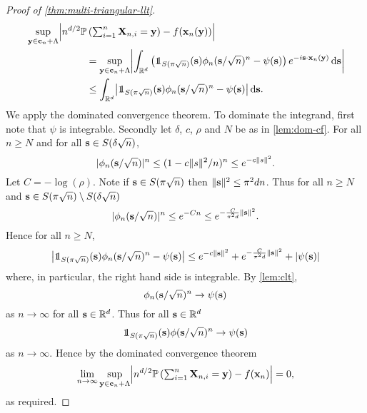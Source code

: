 \begin{proof}[Proof of \cref{thm:multi-triangular-llt}]
\begin{align*}
        &\sup_{\vy \in \vc_n + \lattice} \abs*{
            n^{d/2} \P\left( \textstyle \sum_{i=1}^n \vX_{n, i} = \vy \right) - f(\vx_n(\vy))
            } \nonumber \\
        &\hspace{6em} = \sup_{\vy \in \vc_n + \lattice} \abs*{
            \int_{\R^d} \left(\one_{S(\pi \sqrt{n})}(\vs) \phi_n(\vs/\sqrt{n})^n - \psi(\vs)\right) e^{-i\vs \cdot \vx_n(\vy)} \dif \vs
            } \\
        &\hspace{6em} \leq \int_{\R^d} \abs*{ \one_{S(\pi \sqrt{n})}(\vs) \phi_n(\vs/\sqrt{n})^n - \psi(\vs)} \dif \vs.
    \end{align*}
    We apply the dominated convergence theorem. To dominate the integrand, first note that $\psi$ is integrable. Secondly let $\delta$, $c$, $\rho$ and $N$ be as in \cref{lem:dom-cf}. For all $n \geq N$ and for all ${\mathbf s} \in S(\delta \sqrt{n})$, 
    \begin{equation*}
        \lvert\phi_n({\mathbf s}/\sqrt{n})\rvert^n
        \leq (1 - c \lVert s\rVert^2/n)^n
        \leq e^{-c \lVert s\rVert^2}.
    \end{equation*}
    Let $C = - \log(\rho)$. Note if ${\mathbf s} \in S(\pi \sqrt{n})$ then $\lVert{\mathbf s}\rVert^2 \leq \pi^2 d n$. Thus for all $n \geq N$ and ${\mathbf s} \in S(\pi \sqrt{n}) \setminus S(\delta \sqrt{n})$
    \begin{equation*}
        \lvert\phi_n({\mathbf s}/\sqrt{n})\rvert^n
        \leq e^{-Cn} 
        \leq e^{- \frac{C}{\pi^2 d} \lVert{\mathbf s}\rVert^2}.
    \end{equation*}
    Hence for all $n \geq N$,
    \begin{equation*}
        \abs*{ \one_{S(\pi \sqrt{n})}(\vs) \phi_n(\vs/\sqrt{n})^n - \psi(\vs)}
        \leq e^{-c \norm{\vs}^2} + e^{- \frac{C}{\pi^2 d} \norm{\vs}^2} + \abs{\psi(\vs)}
    \end{equation*}
    where, in particular, the right hand side is integrable. By \cref{lem:clt},
    \begin{equation*}
        \phi_n({\mathbf s}/\sqrt{n})^n \to \psi({\mathbf s})
    \end{equation*}
    as $n \to \infty$ for all ${\mathbf s} \in {\mathbb R}^d$. Thus for all ${\mathbf s} \in {\mathbb R}^d$
    \begin{equation*}
        \one_{S(\pi\sqrt{n})}(\vs) \phi(\vs/\sqrt{n})^n \to \psi(\vs)
    \end{equation*}
    as $n \to \infty$. Hence by the dominated convergence theorem
    \begin{equation*}
        \lim_{n \to \infty} \sup_{\vy \in \vc_n + \lattice} \abs*{
            n^{d/2} \P\left( \textstyle \sum_{i=1}^n \vX_{n, i} = \vy \right) - f(\vx_n)
            } = 0,
    \end{equation*}
    as required.


\end{proof}
